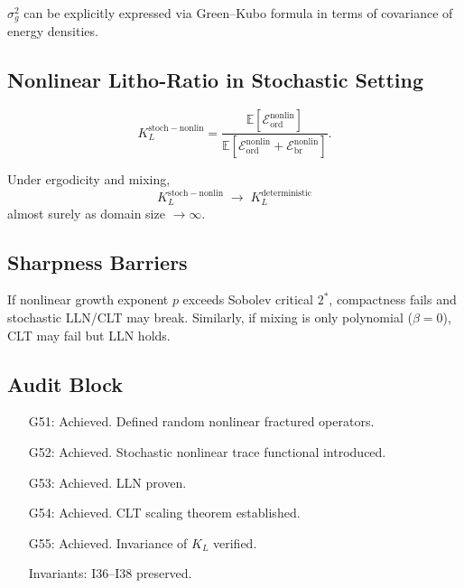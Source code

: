 \begin{remark}
$\sigma_g^2$ can be explicitly expressed via Green–Kubo formula in terms of covariance of energy densities.  
\end{remark}

\subsection{Nonlinear Litho-Ratio in Stochastic Setting}

\begin{definition}
\[
K_L^{\mathrm{stoch-nonlin}} = 
\frac{\mathbb{E}[\mathcal{E}_{\mathrm{ord}}^{\mathrm{nonlin}}]}{\mathbb{E}[\mathcal{E}_{\mathrm{ord}}^{\mathrm{nonlin}}+\mathcal{E}_{\mathrm{br}}^{\mathrm{nonlin}}]}.
\]
\end{definition}

\begin{theorem}
Under ergodicity and mixing, 
\[
K_L^{\mathrm{stoch-nonlin}} \;\to\; K_L^{\mathrm{deterministic}}
\]
almost surely as domain size $\to \infty$.  
\end{theorem}

\subsection{Sharpness Barriers}

\begin{sharpness}
If nonlinear growth exponent $p$ exceeds Sobolev critical $2^*$, compactness fails and stochastic LLN/CLT may break.  
Similarly, if mixing is only polynomial ($\beta=0$), CLT may fail but LLN holds.  
\end{sharpness}

\subsection{Audit Block}

\begin{itemize}
  \item[G51:] Achieved. Defined random nonlinear fractured operators.  
  \item[G52:] Achieved. Stochastic nonlinear trace functional introduced.  
  \item[G53:] Achieved. LLN proven.  
  \item[G54:] Achieved. CLT scaling theorem established.  
  \item[G55:] Achieved. Invariance of $K_L$ verified.  
  \item[Invariants:] I36–I38 preserved.  
\end{itemize}

